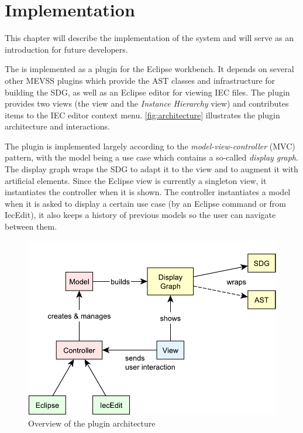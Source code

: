 \chapter{Implementation} \label{ch:impl}

This chapter will describe the implementation of the system and will serve as an introduction for future developers.

The \SB is implemented as a plugin for the Eclipse workbench. It depends on several other MEVSS plugins which provide 
the AST classes and infrastructure for building the SDG, as well as an Eclipse editor for viewing IEC files. The \SB 
plugin provides two views (the \emph{\SB} view and the \emph{Instance Hierarchy} view) and contributes items to the IEC 
editor context menu. \autoref{fig:architecture} illustrates the plugin architecture and interactions.

The plugin is implemented largely according to the \emph{model-view-controller} (MVC) pattern, with the model being a 
use case which contains a so-called \emph{display graph}. The display graph wraps the SDG to adapt it to the view and 
to augment it with artificial elements. Since the Eclipse view is currently a singleton view, it instantiates the 
controller when it is shown. The controller instantiates a model when it is asked to display a certain use case (by an 
Eclipse command or from IecEdit), it also keeps a history of previous models so the user can navigate between them.

\begin{figure}[htb]
  \centering
    \includegraphics[scale=0.7]{bilder/architecture}
  \caption{Overview of the plugin architecture}
  \label{fig:architecture}
\end{figure}


